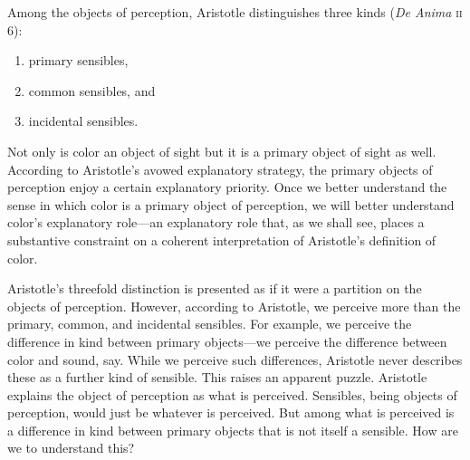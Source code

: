 Among the objects of perception, Aristotle distinguishes three kinds (\emph{De Anima} \textsc{ii} 6):
\begin{enumerate}[(1)]
	\item primary sensibles,
	\item common sensibles, and
	\item incidental sensibles.
\end{enumerate}
Not only is color an object of sight but it is a primary object of sight as well. According to Aristotle's avowed explanatory strategy, the primary objects of perception enjoy a certain explanatory priority. Once we better understand the sense in which color is a primary object of perception, we will better understand color's explanatory role---an explanatory role that, as we shall see, places a substantive constraint on a coherent interpretation of Aristotle's definition of color.

Aristotle's threefold distinction is presented as if it were a partition on the objects of perception. However, according to Aristotle, we perceive more than the primary, common, and incidental sensibles. For example, we perceive the difference in kind between primary objects---we perceive the difference between color and sound, say. While we perceive such differences, Aristotle never describes these as a further kind of sensible. This raises an apparent puzzle. Aristotle explains the object of perception as what is perceived. Sensibles, being objects of perception, would just be whatever is perceived. But among what is perceived is a difference in kind between primary objects that is not itself a sensible. How are we to understand this? 

